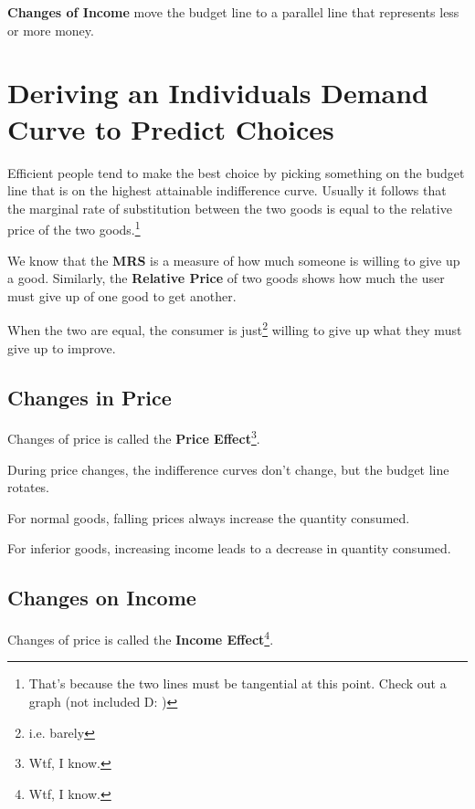                     \textbf{Changes of Income} move the budget line to a parallel line that represents less or more money.
            \section{Deriving an Individuals Demand Curve to Predict Choices} %
            \label{sec:deriving_an_individuals_demand_curve_to_predict_choices}
                Efficient people tend to make the best choice by picking something on the budget line that is on the highest attainable indifference curve.
                Usually it follows that the marginal rate of substitution between the two goods is equal to the relative price of the two goods.\footnote{That's because the two lines must be tangential at this point. Check out a graph (not included D: )}

                We know that the \textbf{MRS} is a measure of how much someone is willing to give up a good.
                Similarly, the \textbf{Relative Price} of two goods shows how much the user must give up of one good to get another.

                When the two are equal, the consumer is just\footnote{i.e. barely} willing to give up what they must give up to improve.

                \subsection{Changes in Price} %
                \label{sub:changes_in_price}
                    Changes of price is called the \textbf{Price Effect}\footnote{Wtf, I know.}.

                    During price changes, the indifference curves don't change, but the budget line rotates.

                    For normal goods, falling prices always increase the quantity consumed.

                    For inferior goods, increasing income leads to a decrease in quantity consumed.
                \subsection{Changes on Income} %
                \label{sub:changes_on_income}
                    Changes of price is called the \textbf{Income Effect}\footnote{Wtf, I know.}.

